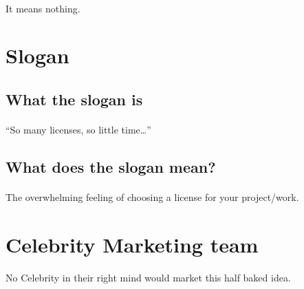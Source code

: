 \paragraph{}
It means nothing.
\par

\section{Slogan}

\subsection{What the slogan is}
\paragraph{}
``So many licenses, so little time\ldots''
\par

\subsection{What does the slogan mean?}
\paragraph{}
The overwhelming feeling of choosing a license for your project/work.
\par

\section{Celebrity Marketing team}

\paragraph{}
No Celebrity in their right mind would market this half baked idea.
\par
